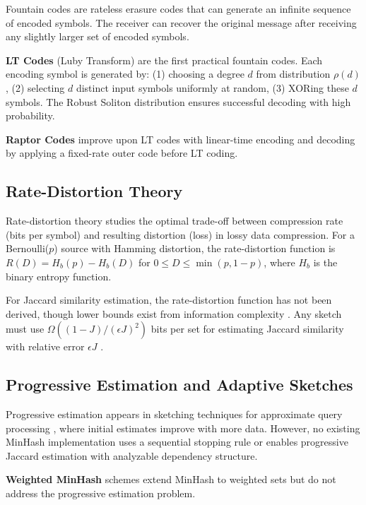 \documentclass[11pt,letterpaper]{article}
\begin{document}
Fountain codes are rateless erasure codes that can generate an infinite sequence of encoded symbols. The receiver can recover the original message after receiving any slightly larger set of encoded symbols.

\textbf{LT Codes} \cite{Luby2002} (Luby Transform) are the first practical fountain codes. Each encoding symbol is generated by: (1) choosing a degree $d$ from distribution $\rho(d)$, (2) selecting $d$ distinct input symbols uniformly at random, (3) XORing these $d$ symbols. The Robust Soliton distribution ensures successful decoding with high probability.

\textbf{Raptor Codes} \cite{Shokrollahi2006} improve upon LT codes with linear-time encoding and decoding by applying a fixed-rate outer code before LT coding.

\subsection{Rate-Distortion Theory}

Rate-distortion theory \cite{Cover1991, Wikipedia2023} studies the optimal trade-off between compression rate (bits per symbol) and resulting distortion (loss) in lossy data compression. For a Bernoulli($p$) source with Hamming distortion, the rate-distortion function is $R(D) = H_b(p) - H_b(D)$ for $0 \leq D \leq \min(p, 1-p)$, where $H_b$ is the binary entropy function.

For Jaccard similarity estimation, the rate-distortion function has not been derived, though lower bounds exist from information complexity \cite{Pagh2014}. Any sketch must use $\Omega((1-J)/(\epsilon J)^2)$ bits per set for estimating Jaccard similarity with relative error $\epsilon J$ \cite{Pagh2014}.

\subsection{Progressive Estimation and Adaptive Sketches}

Progressive estimation appears in sketching techniques for approximate query processing \cite{Cormode2012}, where initial estimates improve with more data. However, no existing MinHash implementation uses a sequential stopping rule or enables progressive Jaccard estimation with analyzable dependency structure.

\textbf{Weighted MinHash} schemes \cite{Ioffe2010} extend MinHash to weighted sets but do not address the progressive estimation problem.
\end{document}
